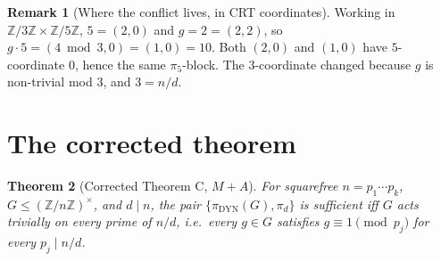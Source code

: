 \documentclass[11pt,reqno]{amsart}
\theoremstyle{plain}
\newtheorem{theorem}{Theorem}
\theoremstyle{definition}
\newtheorem{remark}[theorem]{Remark}
\newcommand{\Z}{\mathbb{Z}}
\newcommand{\Zns}{(\Z/n\Z)^{\times}}
\newcommand{\DYN}{\mathrm{DYN}}
\begin{document}
\begin{remark}[Where the conflict lives, in CRT coordinates]
Working in $\Z/3\Z \times \Z/5\Z$, $5 = (2,0)$ and $g = 2 = (2,2)$, so $g \cdot 5 = (4 \bmod 3, 0) = (1,0) = 10$. Both $(2,0)$ and $(1,0)$ have $5$-coordinate $0$, hence the same $\pi_5$-block. The $3$-coordinate changed because $g$ is non-trivial mod $3$, and $3 = n/d$.
\end{remark}

\section{The corrected theorem}

\begin{theorem}[Corrected Theorem C, $M{+}A$] \label{thm:corrC}
For squarefree $n = p_1 \cdots p_k$, $G \leq \Zns$, and $d \mid n$, the pair $\{\pi_{\DYN}(G), \pi_d\}$ is sufficient iff $G$ acts trivially on every prime of $n/d$, i.e.\ every $g \in G$ satisfies $g \equiv 1 \pmod{p_j}$ for every $p_j \mid n/d$.
\end{theorem}
\end{document}
